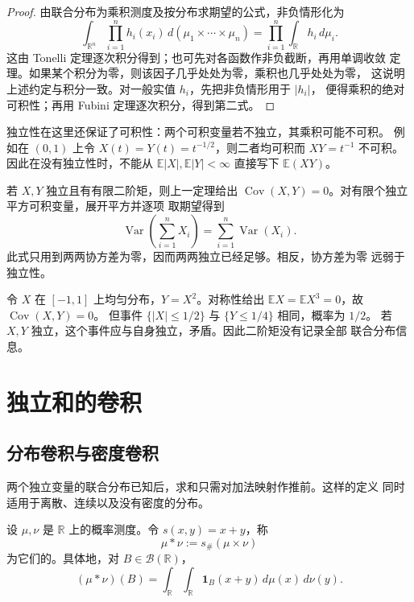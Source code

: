 \begin{proof}
由联合分布为乘积测度及按分布求期望的公式，非负情形化为
\[
 \int_{\mathbb R^n}\prod_{i=1}^nh_i(x_i)\,
 d(\mu_1\times\cdots\times\mu_n)
 =\prod_{i=1}^n\int_{\mathbb R}h_i\,d\mu_i.
\]
这由 Tonelli 定理逐次积分得到；也可先对各函数作非负截断，再用单调收敛
定理。如果某个积分为零，则该因子几乎处处为零，乘积也几乎处处为零，
这说明上述约定与积分一致。对一般实值 $h_i$，先把非负情形用于 $|h_i|$，
便得乘积的绝对可积性；再用 Fubini 定理逐次积分，得到第二式。
\end{proof}

独立性在这里还保证了可积性：两个可积变量若不独立，其乘积可能不可积。
例如在 $(0,1)$ 上令 $X(t)=Y(t)=t^{-1/2}$，则二者均可积而 $XY=t^{-1}$
不可积。因此在没有独立性时，不能从 $\mathbb E|X|,\mathbb E|Y|<\infty$
直接写下 $\mathbb E(XY)$。

若 $X,Y$ 独立且有有限二阶矩，则上一定理给出
$\operatorname{Cov}(X,Y)=0$。对有限个独立平方可积变量，展开平方并逐项
取期望得到
\[
 \operatorname{Var}\left(\sum_{i=1}^nX_i\right)
 =\sum_{i=1}^n\operatorname{Var}(X_i).
\]
此式只用到两两协方差为零，因而两两独立已经足够。相反，协方差为零
远弱于独立性。

\begin{example}[不相关但不独立]
令 $X$ 在 $[-1,1]$ 上均匀分布，$Y=X^2$。对称性给出
$\mathbb E X=\mathbb E X^3=0$，故 $\operatorname{Cov}(X,Y)=0$。
但事件 $\{|X|\le1/2\}$ 与 $\{Y\le1/4\}$ 相同，概率为 $1/2$。
若 $X,Y$ 独立，这个事件应与自身独立，矛盾。因此二阶矩没有记录全部
联合分布信息。
\end{example}

\section{独立和的卷积}
\label{sec:independent-sums-convolution}

\subsection{分布卷积与密度卷积}

两个独立变量的联合分布已知后，求和只需对加法映射作推前。这样的定义
同时适用于离散、连续以及没有密度的分布。

\begin{definition}
\label{def:probability-convolution}
设 $\mu,\nu$ 是 $\mathbb R$ 上的概率测度。令 $s(x,y)=x+y$，称
\[
 \mu*\nu:=s_\#(\mu\times\nu)
\]
为它们的。具体地，对 $B\in\mathcal B(\mathbb R)$，
\[
 (\mu*\nu)(B)
 =\int_{\mathbb R}\int_{\mathbb R}\mathbf 1_B(x+y)\,d\mu(x)\,d\nu(y).
\]
\end{definition}


